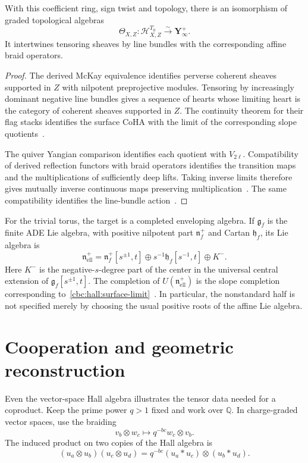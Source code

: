 \begin{theorem}\label{cbc:hall:surface}
With this coefficient ring, sign twist and topology, there is an isomorphism of graded topological algebras
\[
 \Theta_{X,Z}:\mathcal H^{T_0}_{X,Z}
       \xrightarrow{\sim}\mathbf Y^+_\infty.
\]
It intertwines tensoring sheaves by line bundles with the corresponding affine braid operators.
\end{theorem}
\begin{proof}
The derived McKay equivalence identifies perverse coherent sheaves supported in $Z$ with nilpotent preprojective modules.
Tensoring by increasingly dominant negative line bundles gives a sequence of hearts whose limiting heart is the category of coherent sheaves supported in $Z$.
The continuity theorem for their flag stacks identifies the surface CoHA with the limit of the corresponding slope quotients~\cite[Theorem~III.7.5]{DPPSSV}.

The quiver Yangian comparison identifies each quotient with $V_{2\ell}$.
Compatibility of derived reflection functors with braid operators identifies the transition maps and the multiplications of sufficiently deep lifts.
Taking inverse limits therefore gives mutually inverse continuous maps preserving multiplication~\cite[Theorem~III.7.8]{DPPSSV}.
The same compatibility identifies the line-bundle action~\cite[Proposition~III.7.14]{DPPSSV}.
\end{proof}

For the trivial torus, the target is a completed enveloping algebra.
If $\mathfrak g_f$ is the finite ADE Lie algebra, with positive nilpotent part $\mathfrak n_f^+$ and Cartan $\mathfrak h_f$, its Lie algebra is
\[
 \mathfrak n^+_{\mathrm{ell}}
 =\mathfrak n_f^+[s^{\pm1},t]
   \oplus s^{-1}\mathfrak h_f[s^{-1},t]\oplus K^-.
\]
Here $K^-$ is the negative-$s$-degree part of the center in the universal central extension of $\mathfrak g_f[s^{\pm1},t]$.
The completion of $U(\mathfrak n^+_{\mathrm{ell}})$ is the slope completion corresponding to~\eqref{cbc:hall:surface-limit}~\cite[Theorem~III.7.25]{DPPSSV}.
In particular, the nonstandard half is not specified merely by choosing the usual positive roots of the affine Lie algebra.

\section{Cooperation and geometric reconstruction}
Even the vector-space Hall algebra illustrates the tensor data needed for a coproduct.
Keep the prime power $q>1$ fixed and work over $\mathbb Q$.
In charge-graded vector spaces, use the braiding
\[
 v_b\otimes w_c\longmapsto q^{-bc}w_c\otimes v_b.
\]
The induced product on two copies of the Hall algebra is
\[
 (u_a\otimes u_b)(u_c\otimes u_d)
     =q^{-bc}(u_a*u_c)\otimes(u_b*u_d).
\]

